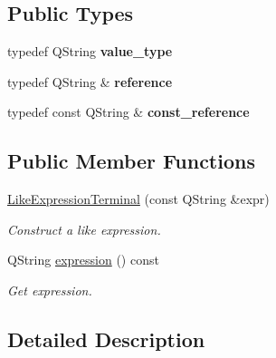 \subsection*{Public Types}
\begin{DoxyCompactItemize}
\item 
typedef Q\+String {\bfseries value\+\_\+type}\hypertarget{struct_mdt_1_1_filter_expression_1_1_like_expression_terminal_a0182f1d1e3d252c6e8d8bfba8145bda1}{}\label{struct_mdt_1_1_filter_expression_1_1_like_expression_terminal_a0182f1d1e3d252c6e8d8bfba8145bda1}

\item 
typedef Q\+String \& {\bfseries reference}\hypertarget{struct_mdt_1_1_filter_expression_1_1_like_expression_terminal_a93524eed9ac4fb4d8b2a9bf2127a6c3e}{}\label{struct_mdt_1_1_filter_expression_1_1_like_expression_terminal_a93524eed9ac4fb4d8b2a9bf2127a6c3e}

\item 
typedef const Q\+String \& {\bfseries const\+\_\+reference}\hypertarget{struct_mdt_1_1_filter_expression_1_1_like_expression_terminal_ab5df1df1c53db2113b7f573dfabbb60d}{}\label{struct_mdt_1_1_filter_expression_1_1_like_expression_terminal_ab5df1df1c53db2113b7f573dfabbb60d}

\end{DoxyCompactItemize}
\subsection*{Public Member Functions}
\begin{DoxyCompactItemize}
\item 
\hyperlink{struct_mdt_1_1_filter_expression_1_1_like_expression_terminal_a75f77759b0b7105f1d7531dee40a9558}{Like\+Expression\+Terminal} (const Q\+String \&expr)
\begin{DoxyCompactList}\small\item\em Construct a like expression. \end{DoxyCompactList}\item 
Q\+String \hyperlink{struct_mdt_1_1_filter_expression_1_1_like_expression_terminal_a412c52c77b9901dc8fc1e59a42df568b}{expression} () const 
\begin{DoxyCompactList}\small\item\em Get expression. \end{DoxyCompactList}\end{DoxyCompactItemize}


\subsection{Detailed Description}
